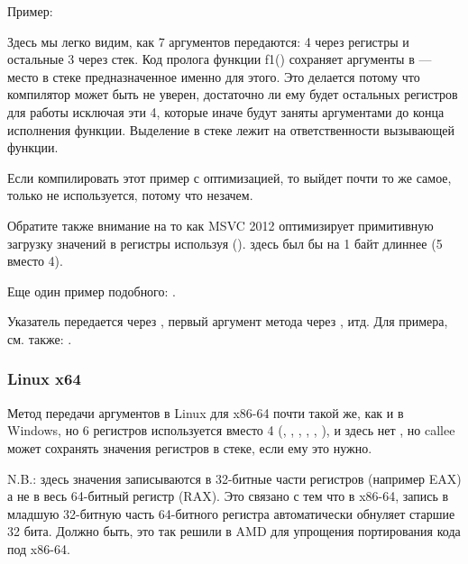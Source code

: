 Пример:





Здесь мы легко видим, как 7 аргументов передаются: 4 через регистры и остальные 3 через стек.
Код пролога функции f1() сохраняет аргументы в  --- место в стеке предназначенное
именно для этого.
Это делается потому что компилятор может быть не уверен, достаточно ли ему будет остальных регистров
для работы исключая эти 4, которые иначе будут заняты аргументами до конца исполнения функции.
Выделение  в стеке лежит на ответственности вызывающей функции.



Если компилировать этот пример с оптимизацией, то выйдет почти то же самое, 
только  не используется, потому что незачем.

\label{using_MOV_and_pack_of_LEA_to_load_values}
Обратите также внимание на то как MSVC 2012 оптимизирует примитивную загрузку значений в регистры
используя \LEA ().
 здесь был бы на 1 байт длиннее (5 вместо 4).

Еще один пример подобного: .


Указатель \ITthis передается через \RCX, первый аргумент метода через \RDX, итд.
Для примера, см. также: .
 
\subsubsection{Linux x64}

Метод передачи аргументов в Linux для x86-64 почти такой же, как и в Windows, но 6 регистров
используется вместо 4 (\RDI, \RSI, \RDX, \RCX, , ), и здесь нет , 
но \gls{callee} может сохранять значения регистров в стеке, если ему это нужно.



N.B.: здесь значения записываются в 32-битные части регистров (например EAX) а не в весь 64-битный
регистр (RAX).
Это связано с тем что в x86-64,
запись в младшую 32-битную часть 64-битного регистра автоматически обнуляет старшие 32 бита.
Должно быть, это так решили в AMD для упрощения портирования кода под x86-64.

